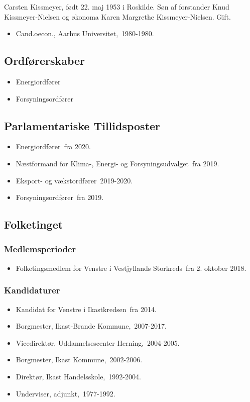 \documentclass[11pt, a4paper]{awesome-cv}
\begin{document}
\makecvheader[R]
\makelettertitle
\begin{cvletter}
Carsten Kissmeyer, født 22. maj 1953 i Roskilde. Søn af forstander Knud Kissmeyer-Nielsen og økonoma Karen Margrethe Kissmeyer-Nielsen. Gift.

\begin{itemize}
\item Cand.oecon., Aarhus Universitet, 1980-1980.
\end{itemize}
\subsection*{Ordførerskaber}
\begin{itemize}
\item Energiordfører
\item Forsyningsordfører
\end{itemize}
\subsection*{Parlamentariske Tillidsposter}
\begin{itemize}
\item Energiordfører fra 2020.
\item Næstformand for Klima-, Energi- og Forsyningsudvalget fra 2019.
\item Eksport- og vækstordfører 2019-2020.
\item Forsyningsordfører fra 2019.
\end{itemize}
\subsection*{Folketinget}
\subsubsection*{Medlemsperioder}
\begin{itemize}
\item Folketingsmedlem for Venstre i Vestjyllands Storkreds fra 2. oktober 2018.
\end{itemize}
\subsubsection*{Kandidaturer}
\begin{itemize}
\item Kandidat for Venstre i Ikastkredsen fra 2014.
\end{itemize}
\begin{itemize}
\item Borgmester, Ikast-Brande Kommune, 2007-2017.
\item Vicedirektør, Uddannelsescenter Herning, 2004-2005.
\item Borgmester, Ikast Kommune, 2002-2006.
\item Direktør, Ikast Handelsskole, 1992-2004.
\item Underviser, adjunkt, 1977-1992.
\end{itemize}
\end{cvletter}
\end{document}
